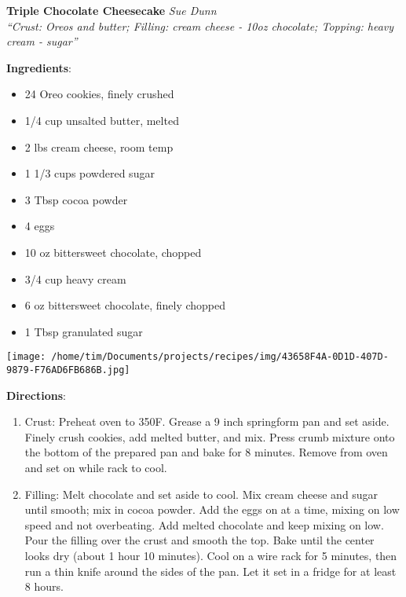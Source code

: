\documentclass[11pt, twoside, openany]{book}
\begin{document}
\noindent\begin{minipage}[t]{\linewidth}%
{\Large\textbf{Triple Chocolate Cheesecake}} \label{triple-chocolate-cheesecake}\hfill\textit{Sue Dunn}\\
\textit{``Crust: Oreos and butter; Filling: cream cheese - 10oz chocolate; Topping: heavy cream - sugar''}\\
\noindent\begin{minipage}[t]{0.78\linewidth}%
\textbf{Ingredients}:\vspace{-3mm}
\begin{multicols}{2}
\begin{itemize}\setlength\itemsep{-1mm}
\item 24 Oreo cookies, finely crushed
\item 1/4 cup unsalted butter, melted
\item 2 lbs cream cheese, room temp
\item 1 1/3 cups powdered sugar
\item 3 Tbsp cocoa powder
\item 4 eggs
\item 10 oz bittersweet chocolate, chopped
\item 3/4 cup heavy cream
\item 6 oz bittersweet chocolate, finely chopped
\item 1 Tbsp granulated sugar
\end{itemize}
\end{multicols}
\end{minipage}
\noindent\begin{minipage}[t]{0.18\linewidth}
\centering \strut\vspace*{-\baselineskip}\newline
\texttt{[image: /home/tim/Documents/projects/recipes/img/43658F4A-0D1D-407D-9879-F76AD6FB686B.jpg]}\\
\end{minipage}\vspace{3mm}
\textbf{Directions}:
\vspace{-3mm}\begin{enumerate}\setlength\itemsep{-1mm}
\item Crust: Preheat oven to 350F. Grease a 9 inch springform pan and set aside. Finely crush cookies, add melted butter, and mix. Press crumb mixture onto the bottom of the prepared pan and bake for 8 minutes. Remove from oven and set on while rack to cool.
\item Filling: Melt chocolate and set aside to cool. Mix cream cheese and sugar until smooth; mix in cocoa powder. Add the eggs on at a time, mixing on low speed and not overbeating. Add melted chocolate and keep mixing on low. Pour the filling over the crust and smooth the top. Bake until the center looks dry (about 1 hour 10 minutes). Cool on a wire rack for 5 minutes, then run a thin knife around the sides of the pan. Let it set in a fridge for at least 8 hours.

\end{enumerate}
\end{minipage}
\end{document}
